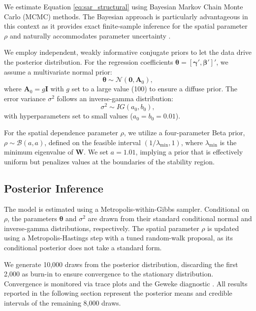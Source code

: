\documentclass[
	a4paper, %
	10pt, %
]{LTJournalArticle}
\begin{document}
We estimate Equation \eqref{eq:sar_structural} using Bayesian Markov Chain Monte Carlo (MCMC) methods. The Bayesian approach is particularly advantageous in this context as it provides exact finite-sample inference for the spatial parameter $\rho$ and naturally accommodates parameter uncertainty \citep{lesage2009introduction}.

We employ independent, weakly informative conjugate priors to let the data drive the posterior distribution. For the regression coefficients $\boldsymbol{\theta} = [\boldsymbol{\gamma}', \boldsymbol{\beta}']'$, we assume a multivariate normal prior:
\begin{equation}
\boldsymbol{\theta} \sim \mathcal{N}(\mathbf{0}, \mathbf{A}_0),
\end{equation}
where $\mathbf{A}_0 = g \mathbf{I}$ with $g$ set to a large value (100) to ensure a diffuse prior. The error variance $\sigma^2$ follows an inverse-gamma distribution:
\begin{equation}
\sigma^2 \sim IG(a_0, b_0),
\end{equation}
with hyperparameters set to small values ($a_0 = b_0 = 0.01$).

For the spatial dependence parameter $\rho$, we utilize a four-parameter Beta prior, $\rho \sim \mathcal{B}(a, a)$, defined on the feasible interval $(1/\lambda_{\min}, 1)$, where $\lambda_{\min}$ is the minimum eigenvalue of $\mathbf{W}$. We set $a=1.01$, implying a prior that is effectively uniform but penalizes values at the boundaries of the stability region.

\subsection{Posterior Inference}

The model is estimated using a Metropolis-within-Gibbs sampler. Conditional on $\rho$, the parameters $\boldsymbol{\theta}$ and $\sigma^2$ are drawn from their standard conditional normal and inverse-gamma distributions, respectively. The spatial parameter $\rho$ is updated using a Metropolis-Hastings step with a tuned random-walk proposal, as its conditional posterior does not take a standard form.

We generate 10,000 draws from the posterior distribution, discarding the first 2,000 as burn-in to ensure convergence to the stationary distribution. Convergence is monitored via trace plots and the Geweke diagnostic \citep{geweke1991evaluating}. All results reported in the following section represent the posterior means and credible intervals of the remaining 8,000 draws.
\end{document}
